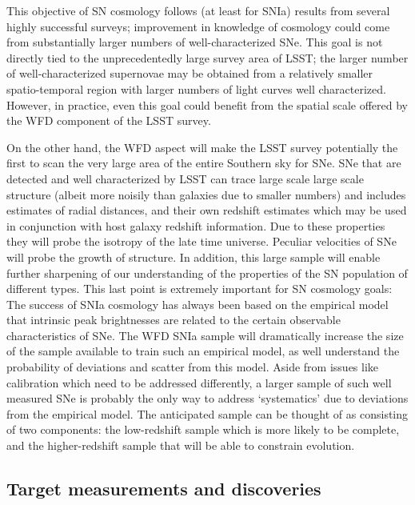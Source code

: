 This objective of SN cosmology follows (at least for SNIa) results from
several highly successful surveys; improvement in knowledge of cosmology
could come from substantially larger numbers of well-characterized SNe.
This goal is not directly tied to the unprecedentedly large survey area of
LSST; the larger number of well-characterized supernovae may be obtained from
a relatively smaller spatio-temporal region with larger numbers of light curves
well characterized. However, in practice, even this goal could
benefit from the spatial scale offered by the WFD component of the LSST
survey. 

On the other hand, the WFD aspect will make the LSST survey potentially the
first to scan the very large area of the entire Southern sky for SNe. SNe
that are detected and well characterized by LSST can trace large scale
large scale structure (albeit more noisily than galaxies due to smaller numbers) and includes estimates of radial distances, and their own redshift estimates which may be used in conjunction with host galaxy redshift information. Due to
these properties they will probe the isotropy of the late time universe. 
Peculiar velocities of SNe will probe the growth of structure.  In addition, this large sample will enable further sharpening
of our understanding of the properties of the SN population of different
types. This last point is extremely important for SN cosmology goals:  The
success of SNIa cosmology has always been based on the empirical model that
intrinsic peak brightnesses are related to the certain observable
characteristics of SNe. 
The WFD SNIa sample will dramatically increase the size of the sample
available to train such an empirical model, as well understand the
probability of deviations and scatter from this model. Aside from issues
like calibration which need to be addressed differently, a larger sample of
such well measured SNe is probably the only way to address `systematics'
due to deviations from the empirical model. The anticipated sample can be
thought of as consisting of two components:  the low-redshift sample which
is more likely to be complete, and the higher-redshift sample that will be
able to constrain evolution. 


\subsection{Target measurements and discoveries}
\label{sec:\secname:targets}

